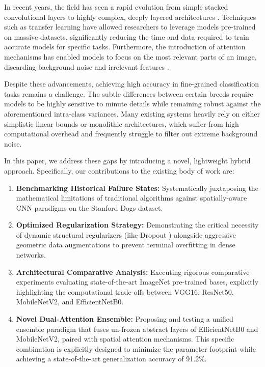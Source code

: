\documentclass[conference]{IEEEtran}
\begin{document}
In recent years, the field has seen a rapid evolution from simple stacked convolutional layers to highly complex, deeply layered architectures \cite{b12}. Techniques such as transfer learning have allowed researchers to leverage models pre-trained on massive datasets, significantly reducing the time and data required to train accurate models for specific tasks. Furthermore, the introduction of attention mechanisms has enabled models to focus on the most relevant parts of an image, discarding background noise and irrelevant features \cite{b4, b15}.

Despite these advancements, achieving high accuracy in fine-grained classification tasks remains a challenge. The subtle differences between certain breeds require models to be highly sensitive to minute details while remaining robust against the aforementioned intra-class variances. Many existing systems heavily rely on either simplistic linear bounds or monolithic architectures, which suffer from high computational overhead and frequently struggle to filter out extreme background noise. 

In this paper, we address these gaps by introducing a novel, lightweight hybrid approach. Specifically, our contributions to the existing body of work are:
\begin{enumerate}
    \item \textbf{Benchmarking Historical Failure States:} Systematically juxtaposing the mathematical limitations of traditional algorithms against spatially-aware CNN paradigms on the Stanford Dogs dataset.
    \item \textbf{Optimized Regularization Strategy:} Demonstrating the critical necessity of dynamic structural regularizers (like Dropout \cite{b9}) alongside aggressive geometric data augmentations \cite{b17} to prevent terminal overfitting in dense networks.
    \item \textbf{Architectural Comparative Analysis:} Executing rigorous comparative experiments evaluating state-of-the-art ImageNet pre-trained bases, explicitly highlighting the computational trade-offs between VGG16, ResNet50, MobileNetV2, and EfficientNetB0.
    \item \textbf{Novel Dual-Attention Ensemble:} Proposing and testing a unified ensemble paradigm that fuses un-frozen abstract layers of EfficientNetB0 and MobileNetV2, paired with spatial attention mechanisms. This specific combination is explicitly designed to minimize the parameter footprint while achieving a state-of-the-art generalization accuracy of 91.2\%.
\end{enumerate}
\end{document}
